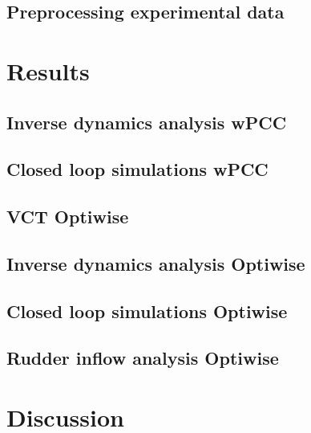 \documentclass[preprint,9pt,authoryear]{elsarticle}
\begin{document}
\subsection{Preprocessing experimental data}

\FloatBarrier

\section{Results}
\label{sec:results}
%
\FloatBarrier

%

\subsection{Inverse dynamics analysis wPCC}

\FloatBarrier
\subsection{Closed loop simulations wPCC}

\FloatBarrier

\subsection{VCT Optiwise}

\FloatBarrier

\subsection{Inverse dynamics analysis Optiwise}

\FloatBarrier
\subsection{Closed loop simulations Optiwise}

\FloatBarrier

\subsection{Rudder inflow analysis Optiwise}

\FloatBarrier

\section{Discussion}
\label{sec:discussion}
\end{document}
